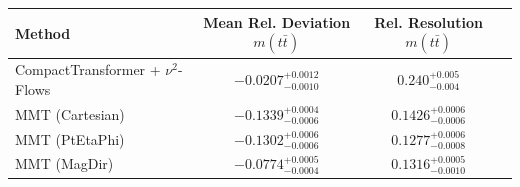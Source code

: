     \begin{tabular}{lccc}
        \toprule
        Method & Mean Rel. Deviation $m(t\bar{t})$ & Rel. Resolution $m(t\bar{t})$ \\
        \midrule
        CompactTransformer + $\nu^2$-Flows & $-0.0207^{+0.0012}_{-0.0010}$ & $0.240^{+0.005}_{-0.004}$ \\
        MMT (Cartesian) & $-0.1339^{+0.0004}_{-0.0006}$ & $0.1426^{+0.0006}_{-0.0006}$ \\
        MMT (PtEtaPhi) & $-0.1302^{+0.0006}_{-0.0006}$ & $0.1277^{+0.0006}_{-0.0008}$ \\
        MMT (MagDir) & $-0.0774^{+0.0005}_{-0.0004}$ & $0.1316^{+0.0005}_{-0.0010}$ \\
        \bottomrule
    \end{tabular}